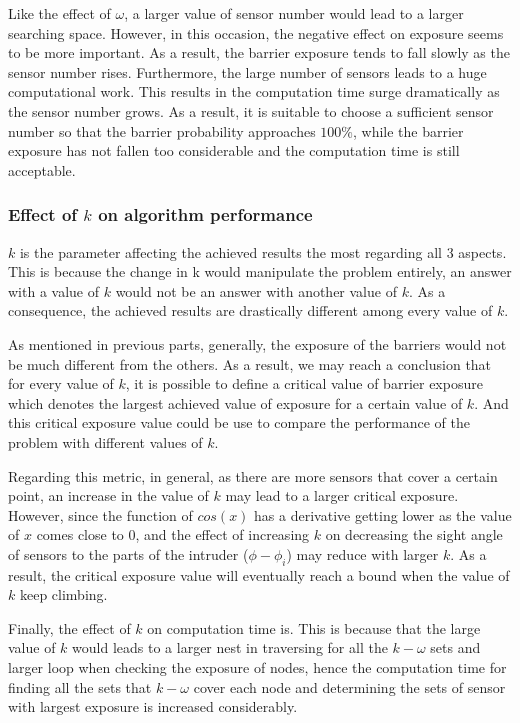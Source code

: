 Like the effect of $\omega$, a larger value of sensor number would lead to a larger searching space. However, in this occasion, the negative effect on exposure seems to be more important. As a result, the barrier exposure tends to fall slowly as the sensor number rises. Furthermore, the large number of sensors leads to a huge computational work. This results in the computation time surge dramatically as the sensor number grows. As a result, it is suitable to choose a sufficient sensor number so that the barrier probability approaches $100\%$, while the barrier exposure has not fallen too considerable and the computation time is still acceptable.

\subsubsection{Effect of $k$ on algorithm performance}

$k$ is the parameter affecting the achieved results the most regarding all 3 aspects. This is because the change in k would manipulate the problem entirely, an answer with a value of $k$ would not be an answer with another value of $k$. As a consequence, the achieved results are drastically different among every value of $k$.

As mentioned in previous parts, generally, the exposure of the barriers would not be much different from the others. As a result, we may reach a conclusion that for every value of $k$, it is possible to define a critical value of barrier exposure which denotes the largest achieved value of exposure for a certain value of $k$. And this critical exposure value could be use to compare the performance of the problem with different values of $k$.

Regarding this metric, in general, as there are more sensors that cover a certain point, an increase in the value of $k$ may lead to a larger critical exposure. However, since the function of $cos(x)$ has a derivative getting lower as the value of $x$ comes close to 0, and the effect of increasing $k$ on decreasing the sight angle of sensors to the parts of the intruder ($\phi - \phi_i$) may reduce with larger $k$. As a result, the critical exposure value will eventually reach a bound when the value of $k$ keep climbing.

Finally, the effect of $k$ on computation time is. This is because that the large value of $k$ would leads to a larger nest in traversing for all the $k-\omega$ sets and larger loop when checking the exposure of nodes, hence the computation time for finding all the sets that $k-\omega$ cover each node and determining the sets of sensor with largest exposure is increased considerably.

